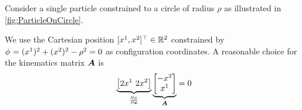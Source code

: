 % 

\clearpage

\begin{Example}
Consider a single particle constrained to a circle of radius $\rho$ as illustrated in \autoref{fig:ParticleOnCircle}.

\begin{minipage}{\textwidth}
 \centering
 
 \label{fig:ParticleOnCircle}
\end{minipage}

We use the Cartesian position $[\sysCoordCoeff{1}, \sysCoordCoeff{2}]^\top \in \RealNum^2$ constrained by $\geoConstraintCoeff{} = (\sysCoordCoeff{1})^2 + (\sysCoordCoeff{2})^2 - \rho^2 = 0$ as configuration coordinates.
A reasonable choice for the kinematics matrix $\kinMat$ is
\begin{align}
 \underbrace{\big[ 2\sysCoordCoeff{1} \ 2\sysCoordCoeff{2} \big]}_{\pdiff[\geoConstraintCoeff{}]{\sysCoord}}
 \underbrace{\begin{bmatrix} -\sysCoordCoeff{2} \\ \sysCoordCoeff{1} \end{bmatrix}}_{\kinMat}
 = 0
\end{align}
\end{Example}
\vfill

